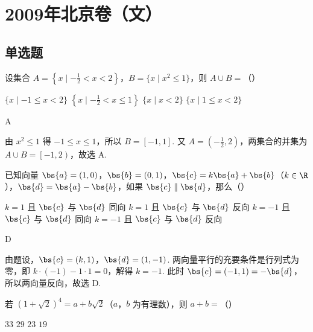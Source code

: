 \chapter{2009年北京卷（文）}

\section{单选题}

\begin{problem}
设集合 \(A = \left\{x \mid -\frac{1}{2} < x < 2\right\}\)，\(B = \{x \mid x^2 \leqslant 1\}\)，则 \(A \cup B =\)（\quad）

\choices
    {\(\{x\mid -1\leqslant x < 2\}\)}
    {\(\left\{x\mid -\frac{1}{2} < x\leqslant 1\right\}\)}
    {\( \{x \mid x < 2\} \)}
    {\(\{x\mid 1\leqslant x < 2\}\)}
\end{problem}

\begin{answer}
A
\end{answer}

\begin{solution}
由 \(x^2\leqslant 1\) 得 \(-1\leqslant x\leqslant 1\)，所以 \(B=\left[-1,1\right]\). 又 \(A=\left(-\frac{1}{2},2\right)\)，两集合的并集为 \(A\cup B=\left[-1,2\right)\)，故选 A.
\end{solution}

\begin{problem}
已知向量 \(\bs{a} = (1,0)\)，\(\bs{b} = (0,1)\)，\(\bs{c} = k\bs{a} + \bs{b}\)（\(k \in \R\)），\(\bs{d} = \bs{a} - \bs{b}\)，如果 \(\bs{c} \parallel \bs{d}\)，那么（\quad）

\choices
    {\(k = 1\) 且 \(\bs{c}\) 与 \(\bs{d}\) 同向}
    {\(k = 1\) 且 \(\bs{c}\) 与 \(\bs{d}\) 反向}
    {\(k = -1\) 且 \(\bs{c}\) 与 \(\bs{d}\) 同向}
    {\(k = -1\) 且 \(\bs{c}\) 与 \(\bs{d}\) 反向}
\end{problem}

\begin{answer}
D
\end{answer}

\begin{solution}
由题设，\(\bs{c}=(k,1)\)，\(\bs{d}=(1,-1)\). 两向量平行的充要条件是行列式为零，即 \(k\cdot(-1)-1\cdot1=0\)，解得 \(k=-1\). 此时 \(\bs{c}=(-1,1)=-\bs{d}\)，所以两向量反向，故选 D.
\end{solution}

\begin{problem}
若 \((1 + \sqrt{2})^4 = a + b\sqrt{2}\)（\(a\)，\(b\) 为有理数），则 \(a + b =\)（\quad）

\choices
    {\(33\)}
    {\(29\)}
    {\(23\)}
    {\(19\)}
\end{problem}

